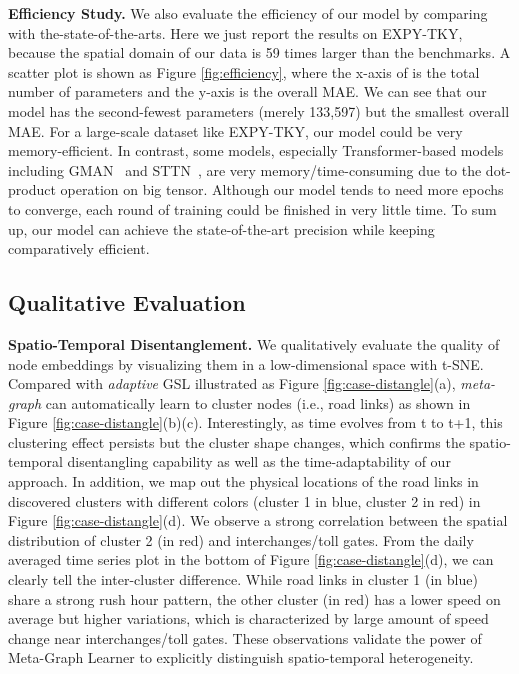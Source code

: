 \documentclass[letterpaper]{article} \usepackage{aaai23}  \usepackage{times}  \usepackage{helvet}  \usepackage{courier}  \usepackage[hyphens]{url}  \usepackage{graphicx} \urlstyle{rm} \def\UrlFont{\rm}  \usepackage{natbib}  \usepackage{caption} \usepackage{multirow}
\begin{document}
\noindent\textbf{Efficiency Study.} We also evaluate the efficiency of our model by comparing with the-state-of-the-arts. Here we just report the results on EXPY-TKY, because the spatial domain of our data is 59 times larger than the benchmarks. A scatter plot is shown as Figure \ref{fig:efficiency}, where the x-axis of is the total number of parameters and the y-axis is the overall MAE. We can see that our model has the second-fewest parameters (merely 133,597) but the smallest overall MAE. For a large-scale dataset like EXPY-TKY, our model could be very memory-efficient. In contrast, some models, especially Transformer-based models including GMAN~\cite{zheng2020gman} and STTN~\cite{xu2020spatial}, are very memory/time-consuming due to the dot-product operation on big tensor. Although our model tends to need more epochs to converge, each round of training could be finished in very little time. To sum up, our model can achieve the state-of-the-art precision while keeping comparatively efficient.
\subsection{Qualitative Evaluation} \label{sec:experiment-casestudy}
\textbf{Spatio-Temporal Disentanglement.} We qualitatively evaluate the quality of node embeddings by visualizing them in a low-dimensional space with t-SNE. Compared with \textit{adaptive} GSL illustrated as Figure \ref{fig:case-distangle}(a), \textit{meta-graph} can automatically learn to cluster nodes (i.e., road links) as shown in Figure \ref{fig:case-distangle}(b)(c). Interestingly, as time evolves from t to t+1, this clustering effect persists but the cluster shape changes, which confirms the spatio-temporal disentangling capability as well as the time-adaptability of our approach. In addition, we map out the physical locations of the road links in discovered clusters with different colors (cluster 1 in blue, cluster 2 in red) in Figure \ref{fig:case-distangle}(d). We observe a strong correlation between the spatial distribution of cluster 2 (in red) and interchanges/toll gates. From the daily averaged time series plot in the bottom of Figure \ref{fig:case-distangle}(d), we can clearly tell the inter-cluster difference. While road links in cluster 1 (in blue) share a strong rush hour pattern, the other cluster (in red) has a lower speed on average but higher variations, which is characterized by large amount of speed change near interchanges/toll gates. These observations validate the power of Meta-Graph Learner to explicitly distinguish spatio-temporal heterogeneity. 
\end{document}
